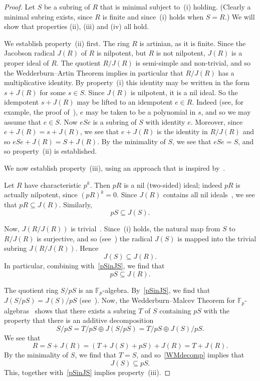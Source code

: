 \documentclass[12pt]{article}
\begin{document}
\begin{proof}
Let $S$ be a subring of $R$ that is minimal subject to~(i) holding. (Clearly a minimal subring exists, since $R$ is finite and since~(i) holds when $S=R$.) We will show that properties (ii), (iii) and (iv) all hold.

We establish property~(ii) first. The ring $R$ is artinian, as it is finite. Since the Jacobson radical $J(R)$ of $R$ is nilpotent, but $R$ is not nilpotent, $J(R)$ is a proper ideal of $R$. The quotient $R/J(R)$ is semi-simple and non-trivial, and so the Wedderburn--Artin Theorem implies in particular that $R/J(R)$ has a multiplicative identity. By property~(i) this identity may be written in the form $s+J(R)$ for some $s\in S$. Since $J(R)$ is nilpotent, it is a nil ideal. So the idempotent $s+J(R)$ may be lifted to an idempotent $e\in R$. Indeed (see, for example, the proof of~\cite[Proposition~III.8.3]{Jacobson}), $e$ may be taken to be a polynomial in $s$, and so we may assume that $e\in S$. Now $eSe$ is a subring of $S$ with identity $e$. Moreover, since $e+J(R)=s+J(R)$, we see that $e+J(R)$ is the identity in $R/J(R)$ and so $eSe+J(R)=S+J(R)$. By the minimality of $S$, we see that $eSe=S$, and so property~(ii) is established.

We now establish property~(iii), using an approach that is inspired by~\cite[Lemma~1]{Clark}.

Let $R$ have characteristic $p^k$. Then $pR$ is a nil (two-sided) ideal; indeed $pR$ is actually nilpotent, since $(pR)^k=0$. Since $J(R)$ contains all nil ideals~\cite[Theorem I.6.2]{Jacobson}, we see that $pR\subseteq J(R)$. Similarly,
\begin{equation}
\label{pSinJS}
pS\subseteq J(S).
\end{equation} 

Now, $J(R/J(R))$ is trivial~\cite[Theorem~I.2.2]{Jacobson}. Since~(i) holds, the natural map from $S$ to $R/J(R)$ is surjective, and so (see~\cite[Proposition~I.7.1]{Jacobson}) the radical $J(S)$ is mapped into the trivial subring $J(R/J(R))$. Hence
\[
J(S)\subseteq J(R).
\]
In particular, combining with~\eqref{pSinJS}, we find that
\begin{equation}
\label{pSinJR}
pS\subseteq J(R).
\end{equation}

The quotient ring $S/pS$ is an $\mathbb{F}_p$-algebra. By~\eqref{pSinJS}, we find that $J(S/pS)=J(S)/pS$ (see~\cite[Proposition~10.4.3]{Cohn}). Now, the Wedderburn--Malcev Theorem for $\mathbb{F}_p$-algebras~\cite[Theorem~72.19]{CurtisReiner} shows that there exists a subring $T$ of $S$ containing $pS$ with the property that there is an additive decomposition
\begin{equation}
\label{WMdecomp}
S/pS=T/pS\oplus J(S/pS)=T/pS\oplus J(S)/pS.
\end{equation}
We see that
\[
R=S+J(R)=(T+J(S)+pS)+J(R)=T+J(R).
\]
By the minimality of $S$, we find that $T=S$, and so~\eqref{WMdecomp} implies that
\[
J(S)\subseteq pS.
\]
This, together with~\eqref{pSinJS} implies property~(iii).


\end{proof}
\end{document}
